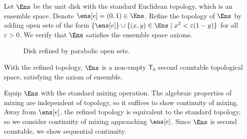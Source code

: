 \begin{example}
	Let $\Ens$ be the unit disk with the standard Euclidean topology, which is an ensemble space. Denote $\ens[e] = (0,1) \in \Ens$. Refine the topology of $\Ens$ by adding open sets of the form $\{\ens[e]\} \cup \{(x,y) \in \Ens \mid x^2 < \varepsilon(1-y)\}$ for all $\varepsilon > 0$. We verify that $\Ens$ satisfies the ensemble space axioms.
	
	\begin{figure}[H]
		\centering
		\caption{Disk refined by parabolic open sets.}
	\end{figure}
	
	With the refined topology, $\Ens$ is a non-empty $\mathsf{T}_0$ second countable topological space, satisfying the axiom of ensemble. 
	
	Equip $\Ens$ with the standard mixing operation. The algebraic properties of mixing are independent of topology, so it suffices to show continuity of mixing. Away from $\ens[e]$, the refined topology is equivalent to the standard topology, so we consider continuity of mixing approaching $\ens[e]$. Since $\Ens$ is second countable, we show sequential continuity.
	

\end{example}
